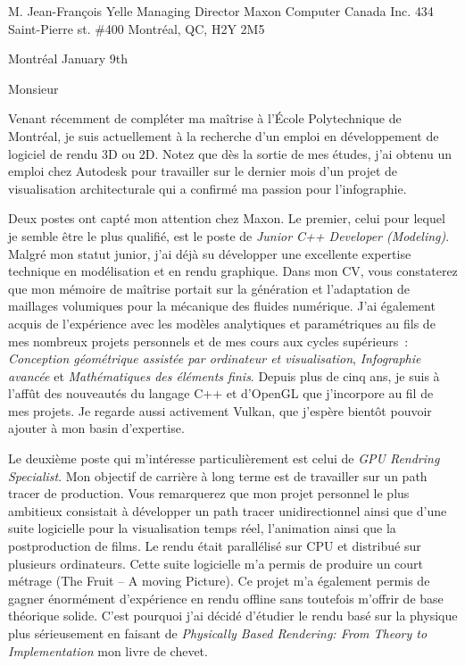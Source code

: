 \insertcvheader

\clrecipient
 {M. Jean-François Yelle}
 {Managing Director}
 {Maxon Computer Canada Inc.}
 {434 Saint-Pierre st. \#400}
 {Montréal, QC, H2Y 2M5}
 
\cllocationdate
 {Montréal}
 {January 9th}
 
\clgreeting
 {Monsieur}
 
Venant récemment de compléter ma maîtrise à l’École Polytechnique de Montréal, je suis actuellement à la recherche d’un emploi en développement de logiciel de rendu 3D ou 2D. Notez que dès la sortie de mes études, j'ai obtenu un emploi chez Autodesk pour travailler sur le dernier mois d'un projet de visualisation architecturale qui a confirmé ma passion pour l'infographie.

Deux postes ont capté mon attention chez Maxon. Le premier, celui pour lequel je semble être le plus qualifié, est le poste de \textit{Junior C++ Developer (Modeling)}. Malgré mon statut junior, j'ai déjà su développer une excellente expertise technique en modélisation et en rendu graphique. Dans mon CV, vous constaterez que mon mémoire de maîtrise portait sur la génération et l'adaptation de maillages volumiques pour la mécanique des fluides numérique. J'ai également acquis de l'expérience avec les modèles analytiques et paramétriques au fils de mes nombreux projets personnels et de mes cours aux cycles supérieurs~: \textit{Conception géométrique assistée par ordinateur et visualisation}, \textit{Infographie avancée} et \textit{Mathématiques des éléments finis}. Depuis plus de cinq ans, je suis à l'affût des nouveautés du langage C++ et d'OpenGL que j'incorpore au fil de mes projets. Je regarde aussi activement Vulkan, que j'espère bientôt pouvoir ajouter à mon basin d'expertise. 

Le deuxième poste qui m'intéresse particulièrement est celui de \textit{GPU Rendring Specialist}. Mon objectif de carrière à long terme est de travailler sur un path tracer de production. Vous remarquerez que mon projet personnel le plus ambitieux consistait à développer un path tracer unidirectionnel ainsi que d'une suite logicielle pour la visualisation temps réel, l'animation ainsi que la postproduction de films. Le rendu était parallélisé sur CPU et distribué sur plusieurs ordinateurs. Cette suite logicielle m'a permis de produire un court métrage (The Fruit -- A moving Picture). Ce projet m'a également permis de gagner énormément d'expérience en rendu offline sans toutefois m'offrir de base théorique solide. C'est pourquoi j'ai décidé d'étudier le rendu basé sur la physique plus sérieusement en faisant de \textit{Physically Based Rendering: From Theory to Implementation} mon livre de chevet.

